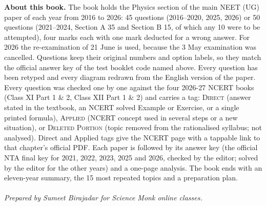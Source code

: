 \vfill
\begin{center}
\begin{minipage}{0.78\textwidth}\centering\small
\textbf{\color{navy}About this book.} The book holds the Physics section of the main NEET (UG) paper of each year from 2016 to 2026: 45 questions (2016--2020, 2025, 2026) or 50 questions (2021--2024, Section A 35 and Section B 15, of which any 10 were to be attempted), four marks each with one mark deducted for a wrong answer. For 2026 the re-examination of 21 June is used, because the 3 May examination was cancelled. Questions keep their original numbers and option labels, so they match the official answer key of the test booklet code named above. Every question has been retyped and every diagram redrawn from the English version of the paper. Every question was checked one by one against the four 2026-27 NCERT books (Class XI Part 1 \& 2, Class XII Part 1 \& 2) and carries a tag: \textsc{Direct} (answer stated in the textbook, an NCERT solved Example or Exercise, or a single printed formula), \textsc{Applied} (NCERT concept used in several steps or a new situation), or \textsc{Deleted Portion} (topic removed from the rationalised syllabus; not analysed). Direct and Applied tags give the NCERT page with a tappable link to that chapter's official PDF. Each paper is followed by its answer key (the official NTA final key for 2021, 2022, 2023, 2025 and 2026, checked by the editor; solved by the editor for the other years) and a one-page analysis. The book ends with an eleven-year summary, the 15 most repeated topics and a preparation plan.\\[8pt]
{\color{gilt}}\\[4pt]
{\itshape Prepared by Sumeet Birajadar for Science Monk online classes.}
\end{minipage}
\end{center}
\clearpage
